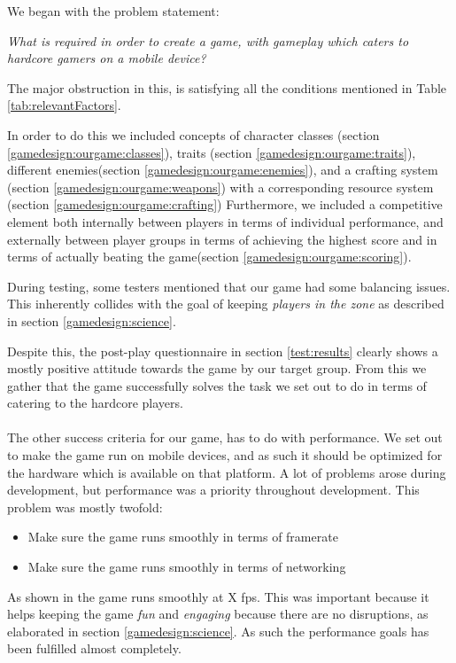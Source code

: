 We began with the problem statement:
\begin{center}
\textit{What is required in order to create a game, with gameplay which caters to hardcore gamers on a mobile device?}
\end{center}

The major obstruction in this, is satisfying all the conditions mentioned in Table \ref{tab:relevantFactors}.

In order to do this we included concepts of character classes (section \ref{gamedesign:ourgame:classes}), traits (section \ref{gamedesign:ourgame:traits}), different enemies(section \ref{gamedesign:ourgame:enemies}), and a crafting system (section \ref{gamedesign:ourgame:weapons}) with a corresponding resource system (section \ref{gamedesign:ourgame:crafting})
Furthermore, we included a competitive element both internally between players in terms of individual performance, and externally between player groups in terms of achieving the highest score and in terms of actually beating the game(section \ref{gamedesign:ourgame:scoring}).

During testing, some testers mentioned that our game had some balancing issues. 
This inherently collides with the goal of keeping \emph{players in the zone} as described in section \ref{gamedesign:science}. 

Despite this, the post-play questionnaire in section \ref{test:results} clearly shows a mostly positive attitude towards the game by our target group.
From this we gather that the game successfully solves the task we set out to do in terms of catering to the hardcore players.\\\\
The other success criteria for our game, has to do with performance. 
We set out to make the game run on mobile devices, and as such it should be optimized for the hardware which is available on that platform. 
A lot of problems arose during development, but performance was a priority throughout development. 
This problem was mostly twofold:

\begin{itemize}
\item Make sure the game runs smoothly in terms of framerate 
\item Make sure the game runs smoothly in terms of networking
\end{itemize}

As shown in  the game runs smoothly at X fps. 
This was important because it helps keeping the game \emph{fun} and \emph{engaging} because there are no disruptions, as elaborated in section \ref{gamedesign:science}.
As such the performance goals has been fulfilled almost completely.